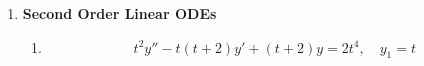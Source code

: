 \documentclass[letterpaper, fontsize=12pt]{scrartcl} %
\numberwithin{equation}{section} %
\numberwithin{figure}{section} %
\numberwithin{table}{section} %
\begin{document}
\begin{enumerate}
\item \textbf{Second Order Linear ODEs}  \begin{enumerate}[label=(\alph*)]
\item \[ t^2y'' - t(t+2)y' +(t+2)y= 2t^4, \quad y_1 = t\]


\end{enumerate}
\end{enumerate}
\end{document}
